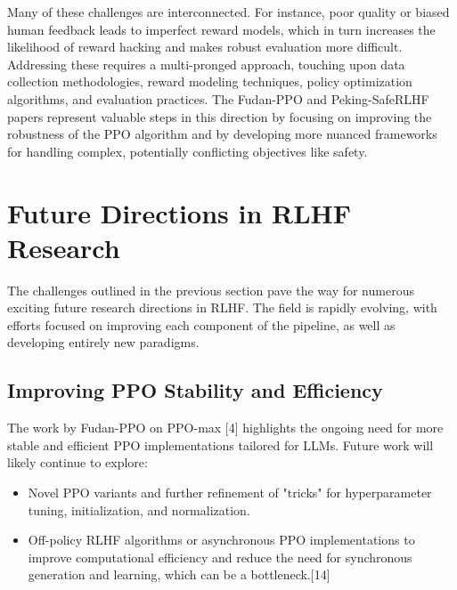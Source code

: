\documentclass[10pt,journal,compsoc]{IEEEtran} %
\begin{document}
Many of these challenges are interconnected. For instance, poor quality or biased human feedback leads to imperfect reward models, which in turn increases the likelihood of reward hacking and makes robust evaluation more difficult. Addressing these requires a multi-pronged approach, touching upon data collection methodologies, reward modeling techniques, policy optimization algorithms, and evaluation practices. The Fudan-PPO and Peking-SafeRLHF papers represent valuable steps in this direction by focusing on improving the robustness of the PPO algorithm and by developing more nuanced frameworks for handling complex, potentially conflicting objectives like safety.

\section{Future Directions in RLHF Research}
\label{sec:future_directions}

The challenges outlined in the previous section pave the way for numerous exciting future research directions in RLHF. The field is rapidly evolving, with efforts focused on improving each component of the pipeline, as well as developing entirely new paradigms.

\subsection{Improving PPO Stability and Efficiency}
The work by Fudan-PPO on PPO-max [4] highlights the ongoing need for more stable and efficient PPO implementations tailored for LLMs. Future work will likely continue to explore:
\begin{itemize}
    \item Novel PPO variants and further refinement of "tricks" for hyperparameter tuning, initialization, and normalization.
    \item Off-policy RLHF algorithms or asynchronous PPO implementations to improve computational efficiency and reduce the need for synchronous generation and learning, which can be a bottleneck.[14]
\end{itemize}
\end{document}
